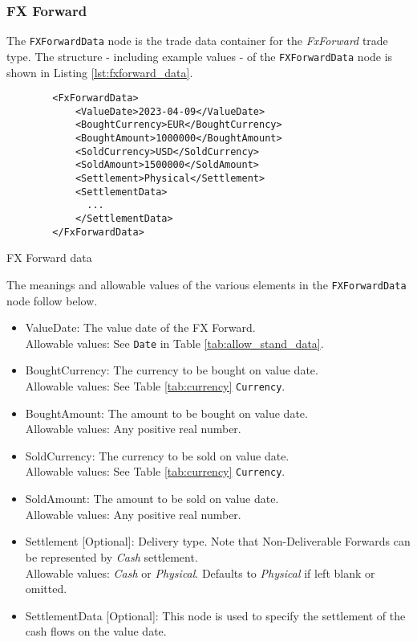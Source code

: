 \subsubsection{FX Forward}

The \lstinline!FXForwardData!  node is the trade data container for the \emph{FxForward} trade type.  The structure -
including example values - of the \lstinline!FXForwardData!  node is shown in Listing \ref{lst:fxforward_data}.

\begin{listing}[H]
\begin{verbatim}
        <FxForwardData>
            <ValueDate>2023-04-09</ValueDate>
            <BoughtCurrency>EUR</BoughtCurrency>
            <BoughtAmount>1000000</BoughtAmount>
            <SoldCurrency>USD</SoldCurrency>
            <SoldAmount>1500000</SoldAmount>
            <Settlement>Physical</Settlement>
            <SettlementData>
              ...
            </SettlementData>
        </FxForwardData>
\end{verbatim}
\caption{FX Forward data}
\label{lst:fxforward_data}
\end{listing}

The meanings and allowable values of the various elements in the \lstinline!FXForwardData!  node follow below.

\begin{itemize}
\item ValueDate: The value date of the FX Forward. \\ Allowable values:  See \lstinline!Date! in Table \ref{tab:allow_stand_data}.
\item BoughtCurrency: The currency to be bought on value date.  \\ Allowable values:  See Table \ref{tab:currency}  \lstinline!Currency!.
\item BoughtAmount: The amount to be bought on value date.  \\ Allowable values:  Any positive real number.
\item SoldCurrency: The currency to be sold on value date.  \\ Allowable values:   See Table \ref{tab:currency}  \lstinline!Currency!.
\item SoldAmount: The amount to be sold on value date.  \\ Allowable values:  Any positive real number.
\item Settlement [Optional]: Delivery type.  Note that Non-Deliverable Forwards can be represented by \emph{Cash} settlement. \\
Allowable values: \emph{Cash} or \emph{Physical}.  Defaults to \emph{Physical} if left blank or omitted.
\item SettlementData [Optional]: This node is used to specify  the settlement of the cash flows on the value date.
\end{itemize}

